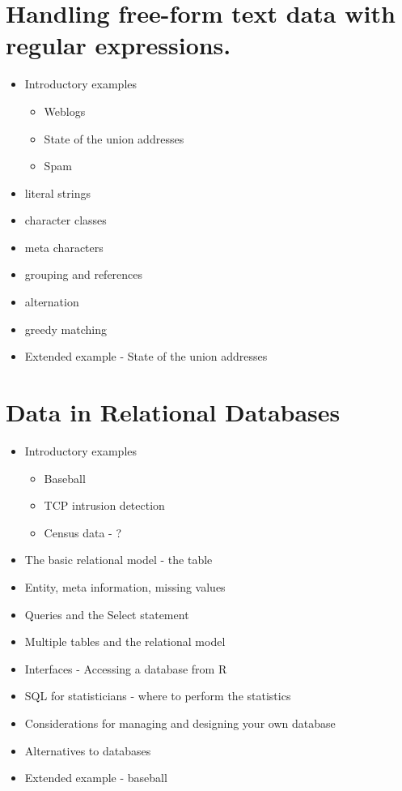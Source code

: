 \documentclass[11pt,timesroman]{article}
\begin{document}
\section{Handling free-form text data with regular expressions.} 
        \begin{itemize}
        \item Introductory examples
          \begin{itemize}
            \item Weblogs
            \item State of the union addresses
            \item Spam
          \end{itemize}
        \item literal strings 
        \item character classes 
        \item meta characters
        \item grouping and references 
 	\item alternation 
 	\item greedy matching
        \item Extended example - State of the union addresses
        \end{itemize}


\section{Data in Relational Databases}
        \begin{itemize}
        \item Introductory examples
          \begin{itemize}
            \item Baseball
            \item TCP intrusion detection
            \item Census data - ?
          \end{itemize}
        \item The basic relational model - the table
        \item Entity, meta information, missing values
        \item Queries and the Select statement
        \item Multiple tables and the relational model
        \item Interfaces - Accessing a database from R 
        \item SQL for statisticians - where to perform the statistics
        \item Considerations for managing and designing your own database
        \item Alternatives to databases
        \item Extended example - baseball
        \end{itemize}
\end{document}
